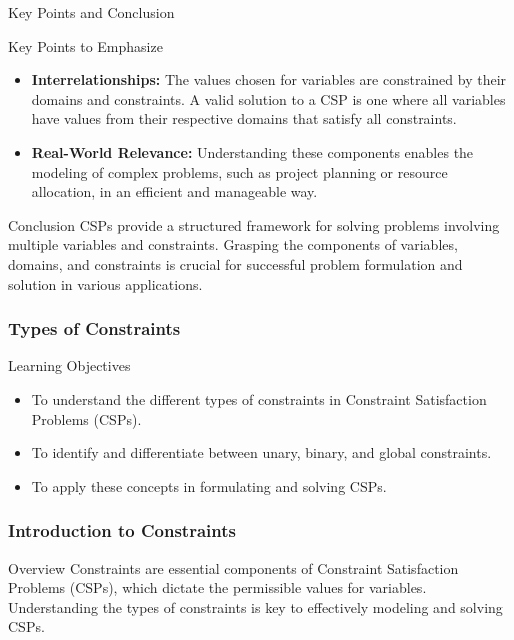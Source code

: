 \documentclass[aspectratio=169]{beamer}
\begin{document}
\begin{frame}[fragile]{Key Points and Conclusion}
    \begin{block}{Key Points to Emphasize}
        \begin{itemize}
            \item \textbf{Interrelationships:} The values chosen for variables are constrained by their domains and constraints. A valid solution to a CSP is one where all variables have values from their respective domains that satisfy all constraints.
            \item \textbf{Real-World Relevance:} Understanding these components enables the modeling of complex problems, such as project planning or resource allocation, in an efficient and manageable way.
        \end{itemize}
    \end{block}
    
    \begin{block}{Conclusion}
        CSPs provide a structured framework for solving problems involving multiple variables and constraints. Grasping the components of variables, domains, and constraints is crucial for successful problem formulation and solution in various applications.
    \end{block}
\end{frame}

\begin{frame}[fragile]
    \frametitle{Types of Constraints}
    \begin{block}{Learning Objectives}
        \begin{itemize}
            \item To understand the different types of constraints in Constraint Satisfaction Problems (CSPs).
            \item To identify and differentiate between unary, binary, and global constraints.
            \item To apply these concepts in formulating and solving CSPs.
        \end{itemize}
    \end{block}
\end{frame}

\begin{frame}[fragile]
    \frametitle{Introduction to Constraints}
    \begin{block}{Overview}
        Constraints are essential components of Constraint Satisfaction Problems (CSPs), which dictate the permissible values for variables. 
        Understanding the types of constraints is key to effectively modeling and solving CSPs.
    \end{block}
\end{frame}
\end{document}
